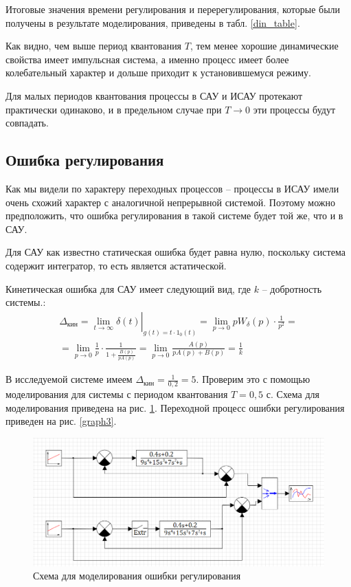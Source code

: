	Итоговые значения времени регулирования и перерегулирования, которые были получены в результате моделирования, приведены в табл. \ref{din_table}. 
	
	Как видно, чем выше период квантования $T$, тем менее хорошие динамические свойства имеет импульсная система, а именно процесс имеет более колебательный характер и дольше приходит к установившемуся режиму.
	
	Для малых периодов квантования процессы в САУ и ИСАУ протекают практически одинаково, и в предельном случае при $T\to 0$ эти процессы будут совпадать.
	
	\subsection{Ошибка регулирования}
	
	Как мы видели по характеру переходных процессов -- процессы в ИСАУ имели очень схожий характер с аналогичной непрерывной системой. Поэтому можно предположить, что ошибка регулирования в такой системе будет той же, что и в САУ.
	
	Для САУ как известно статическая ошибка будет равна нулю, поскольку система содержит интегратор, то есть является астатической.
	
	Кинетическая ошибка для САУ имеет следующий вид, где $k$ -- добротность системы.:
	\begin{multline}
		\Delta_\text{кин} = \left.\lim_{t\to \infty} \delta (t)\right| _{g(t) = t\cdot 1_0 (t)} = \lim_{p\to 0} p W_\delta (p) \cdot \frac{1}{p^2} = \\ = \lim_{p\to 0} \frac{1}{p}\cdot \frac{1}{1+\frac{B(p)}{pA(p)}} = \lim_{p\to 0} \frac{A(p)}{pA(p)+B(p)} = \frac{1}{k}
	\end{multline}
	
	В исследуемой системе имеем $\Delta_\text{кин} = \frac{1}{0,2} = 5$. Проверим это с помощью моделирования для системы с периодом квантования $T=0,5$ с. Схема для моделирования приведена на рис. \ref{scheme2}. Переходной процесс ошибки регулирования приведен на рис. \ref{graph3}.
	
	\begin{figure}
		\centering\includegraphics[width=.7\textwidth]{png/scheme2.png}
		\caption{Схема для моделирования ошибки регулирования}
		\label{scheme2}
	\end{figure}
	
